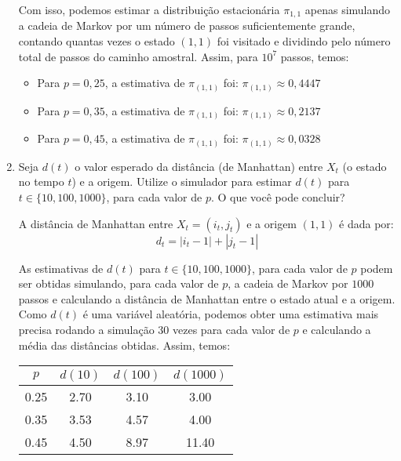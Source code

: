 \begin{enumerate}
\begin{resposta}
        Com isso, podemos estimar a distribuição estacionária $\pi_{1,1}$ apenas simulando a cadeia de Markov por um número de passos suficientemente grande, contando quantas vezes o estado $(1,1)$ foi visitado e dividindo pelo número total de passos do caminho amostral. Assim, para $10^7$ passos, temos:
        \begin{itemize}
            \item Para $p = 0{,}25$, a estimativa de $\pi_{(1,1)}$ foi:
            $ \boxed{\pi_{(1,1)} \approx 0{,}4447} $
            
            \item Para $p = 0{,}35$, a estimativa de $\pi_{(1,1)}$ foi:
            $ \boxed{\pi_{(1,1)} \approx 0{,}2137} $

            \item Para $p = 0{,}45$, a estimativa de $\pi_{(1,1)}$ foi:
            $ \boxed{\pi_{(1,1)} \approx 0{,}0328} $
        \end{itemize}

    \end{resposta}
    \item Seja $d(t)$ o valor esperado da distância (de Manhattan) entre $X_t$ (o estado no tempo $t$) e a origem. Utilize o simulador para estimar $d(t)$ para $t \in \{10, 100, 1000\}$, para cada valor de $p$. O que você pode concluir?
    \begin{resposta}
        A distância de Manhattan entre $X_t=(i_t, j_t)$ e a origem $(1,1)$ é dada por:
        $$d_t = |i_t - 1| + |j_t - 1|$$

        As  estimativas de $d(t)$ para $t \in \{10, 100, 1000\}$, para cada valor de $p$ podem ser obtidas simulando, para cada valor de $p$, a cadeia de Markov por $1000$ passos e calculando a distância de Manhattan entre o estado atual e a origem. Como $d(t)$ é uma variável aleatória, podemos obter uma estimativa mais precisa rodando a simulação 30 vezes para cada valor de $p$ e calculando a média das distâncias obtidas. Assim, temos:

        \begin{center}
            \begin{tabular}{|c|c|c|c|}
            \hline
            $p$ & $d(10)$ & $d(100)$ & $d(1000)$ \\
            \hline
            0.25 & 2.70 & 3.10 & 3.00 \\
            0.35 & 3.53 & 4.57 & 4.00 \\
            0.45 & 4.50 & 8.97 & 11.40 \\
            \hline
        \end{tabular}


\end{center}
\end{resposta}
\end{enumerate}
